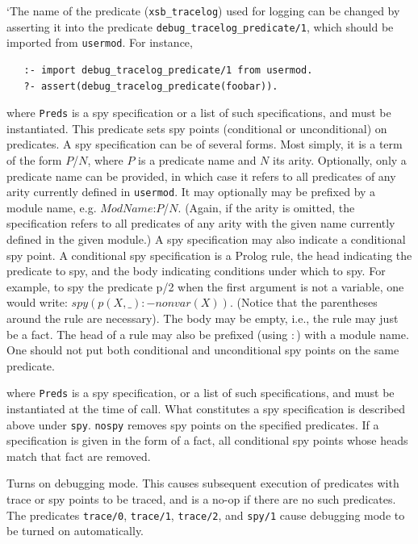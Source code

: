 \begin{description}
`The name of the predicate (\texttt{xsb\_tracelog}) used for logging
can be changed by asserting it into the predicate
\texttt{debug\_tracelog\_predicate/1}, which should be imported from
\texttt{usermod}. For instance,
\begin{verbatim}
   :- import debug_tracelog_predicate/1 from usermod.
   ?- assert(debug_tracelog_predicate(foobar)).
\end{verbatim}

    where {\tt Preds} is a spy specification or a list of such
    specifications, and must be instantiated. This predicate sets spy
    points (conditional or unconditional) on predicates.  A spy
    specification can be of several forms. Most simply, it is a term
    of the form $P$/$N$, where $P$ is a predicate name and $N$ its
    arity.  Optionally, only a predicate name can be provided, in
    which case it refers to all predicates of any arity currently
    defined in {\tt usermod}.  It may optionally may be prefixed by a
    module name, e.g.  $ModName$:$P$/$N$. (Again, if the arity is
    omitted, the specification refers to all predicates of any arity
    with the given name currently defined in the given module.)  A spy
    specification may also indicate a conditional spy point. A
    conditional spy specification is a Prolog rule, the head
    indicating the predicate to spy, and the body indicating
    conditions under which to spy. For example, to spy the predicate
    p/2 when the first argument is not a variable, one would write:
    $spy (p(X,\_):-nonvar(X)).$ (Notice that the parentheses around
    the rule are necessary). The body may be empty, i.e., the rule may
    just be a fact.  The head of a rule may also be prefixed (using
    $:$) with a module name. One should not put both conditional and
    unconditional spy points on the same predicate.

    where {\tt Preds} is a spy specification, or a list of such
    specifications, and must be instantiated at the time of call.  What
    constitutes a spy specification is described above under {\tt spy}.
    {\tt nospy} removes spy points on the specified predicates. If a
    specification is given in the form of a fact, all conditional spy points
    whose heads match that fact are removed.

    Turns on debugging mode.
    This causes subsequent execution of predicates with trace or spy
    points to be traced, and is a no-op if there are no such predicates.
    The predicates {\tt trace/0}, {\tt trace/1}, \texttt{trace/2},  and {\tt spy/1} cause debugging mode
    to be turned on automatically.


\end{description}
